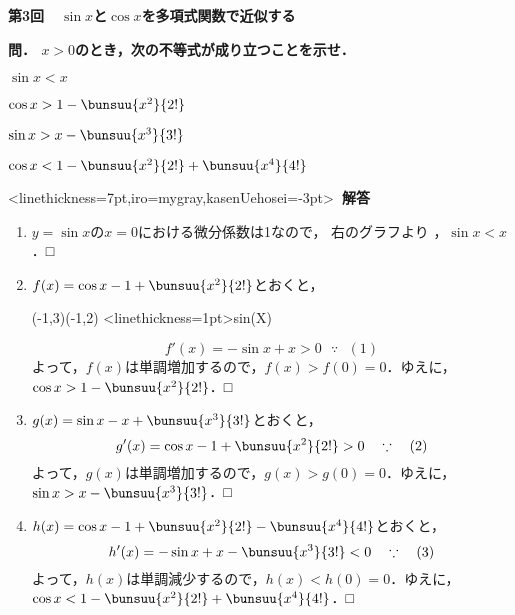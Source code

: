 \documentclass[10pt,
b5paper,
fleqn,
dvipdfmx,
uplatex
]{jsarticle}
\newcommand{\benu}{\begin{enumerate}}
\newcommand{\eenu}{\end{enumerate}}
\newcommand{\beda}{\begin{edaenumerate}}
\newcommand{\eeda}{\end{edaenumerate}}
\newcommand{\bb}{\bf\boldmath}%
\newenvironment{leftbbar}{%
\def\FrameCommand{\color{mygray} \vrule width 5pt \hspace{1zw}
\color{black}}%
\MakeFramed {\advance\hsize-\width \FrameRestore}}%
{\endMakeFramed}
\newenvironment{解答}{
\hspace{-2zw}\phkasen<linethickness=7pt,iro=mygray,kasenUehosei=-3pt>{\bf \large \ 解答\ }\vspace{-1zw}\begin{leftbbar}\vspace{0zw}}{\end{leftbbar}}
\begin{document}
{\bb\Large 第3回\ \ $\sin x$と$\cos x$を多項式関数で近似する}


\begin{tcolorbox}[enhanced,
frame style={left color=orange!50!white,
right color=black!50!orange},
colback=black!0!white,
drop fuzzy shadow]
\bb 
{\large 問．} $x>0$のとき，次の不等式が成り立つことを示せ．
\beda
\item $\sin x<x$
\item $\cos x >1-\bunsuu{x^2}{2!}$
\item $\sin x>x-\bunsuu{x^3}{3!}$
\item $\cos x <1-\bunsuu{x^2}{2!}+\bunsuu{x^4}{4!}$
\eeda
\end{tcolorbox}

\begin{解答}\vspace{-2.5zw}
\benu
\item 
$y=\sin x$の$x=0$における微分係数は1なので，
右のグラフより
，$\sin x <x$．\hfill □
\item $f(x)=\cos x-1+\bunsuu{x^2}{2!}$とおくと，
\begin{mawarikomi}{}{
\vspace{2zw}
\begin{zahyou}[ul=5mm](-1,3)(-1,2)
\YGraph<linethickness=1pt>{sin(X)}
\end{zahyou}
}
\[f'(x)=-\sin x+x>0 \ \ \ \because\ \ \ (1)\]
よって，$f(x)$は単調増加するので，$f(x)>f(0)=0$．ゆえに，$\cos x >1-\bunsuu{x^2}{2!}$．\hfill □
\end{mawarikomi}
\item $g(x)=\sin x-x+\bunsuu{x^3}{3!}$とおくと，
\[g'(x)=\cos x-1+\bunsuu{x^2}{2!} >0 \ \ \ \because\ \ \ (2)\]
よって，$g(x)$は単調増加するので，$g(x)>g(0)=0$．ゆえに，$\sin x>x-\bunsuu{x^3}{3!}$．\hfill □
\item $h(x)=\cos x -1+\bunsuu{x^2}{2!}-\bunsuu{x^4}{4!}$とおくと，
\[h'(x)=-\sin x+x-\bunsuu{x^3}{3!} <0 \ \ \ \because\ \ \ (3)\]
よって，$h(x)$は単調減少するので，$h(x)<h(0)=0$．ゆえに，$\cos x <1-\bunsuu{x^2}{2!}+\bunsuu{x^4}{4!}$．\hfill □
\eenu
\end{解答}
\end{document}
